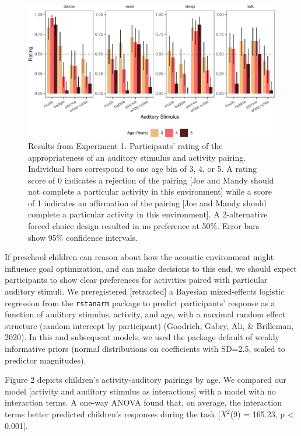 \documentclass[10pt, letterpaper]{article}
\newenvironment{CodeChunk}{}{}
\begin{document}
\begin{CodeChunk}
\begin{figure}[t]

{\centering \includegraphics{figs/e3b-bar-1} 

}

\caption[Results from Experiment 1]{Results from Experiment 1. Participants' rating of the appropriateness of an auditory stimulus and activity pairing. Individual bars correspond to one age bin of 3, 4, or 5. A rating score of 0 indicates a rejection of the pairing [Joe and Mandy should not complete a particular activity in this environment] while a score of 1 indicates an affirmation of the pairing [Joe and Mandy should complete a particular activity in this environment]. A 2-alternative forced choice design resulted in no preference at 50\%.  Error bars show 95\% confidence intervals.}\label{fig:e3b-bar}
\end{figure}
\end{CodeChunk}

If preschool children can reason about how the acoustic environment
might influence goal optimization, and can make decisions to this end,
we should expect participants to show clear preferences for activities
paired with particular auditory stimuli. We preregistered
{[}retracted{]} a Bayesian mixed-effects logistic regression from the
\texttt{rstanarm} package to predict participants' response as a
function of auditory stimulus, activity, and age, with a maximal random
effect structure (random intercept by participant) (Goodrich, Gabry,
Ali, \& Brilleman, 2020). In this and subsequent models, we used the
package default of weakly informative priors (normal distributions on
coefficients with SD=2.5, scaled to predictor magnitudes).

Figure 2 depicts children's activity-auditory pairings by age. We
compared our model {[}activity and auditory stimulus as interactions{]}
with a model with no interaction terms. A one-way ANOVA found that, on
average, the interaction terms better predicted children's responses
during the task {[}\(X^2\)(9) = 165.23, p \textless{} 0.001{]}.
\end{document}
